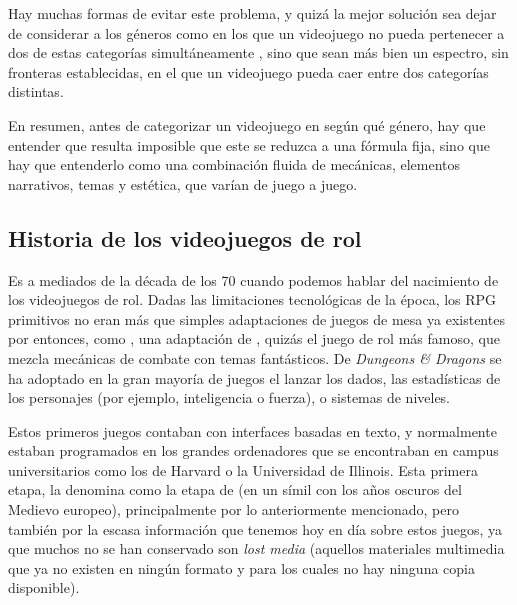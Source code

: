 \smallskip

Hay muchas formas de evitar este problema, y quizá la mejor solución sea dejar de considerar a los géneros como  en los que un videojuego no pueda pertenecer a dos de estas categorías simultáneamente \citep{Apperley}, sino que sean más bien un espectro, sin fronteras establecidas, en el que un videojuego pueda caer entre dos categorías distintas.

\smallskip

En resumen, antes de categorizar un videojuego en según qué género, hay que entender que resulta imposible que este se reduzca a una fórmula fija, sino que hay que entenderlo como una combinación fluida de mecánicas, elementos narrativos, temas y estética, que varían de juego a juego.

\subsection{Historia de los videojuegos de rol}
Es a mediados de la década de los 70 cuando podemos hablar del nacimiento de los videojuegos de rol. Dadas las limitaciones tecnológicas de la época, los RPG primitivos no eran más que simples adaptaciones de juegos de mesa ya existentes por entonces, como , una adaptación de , quizás el juego de rol más famoso, que mezcla mecánicas de combate con temas fantásticos. De \textit{Dungeons \& Dragons} se ha adoptado en la gran mayoría de juegos el lanzar los dados, las estadísticas de los personajes (por ejemplo, inteligencia o fuerza), o sistemas de niveles. 

\smallskip

Estos primeros juegos contaban con interfaces basadas en texto, y normalmente estaban programados en los grandes ordenadores que se encontraban en campus universitarios como los de Harvard o la Universidad de Illinois. Esta primera etapa, \cite{barton2008dungeons} la denomina como la etapa de  (en un símil con los años oscuros del Medievo europeo), principalmente por lo anteriormente mencionado, pero también por la escasa información que tenemos hoy en día sobre estos juegos, ya que muchos no se han conservado son \textit{lost media} (aquellos materiales multimedia que ya no existen en ningún formato y para los cuales no hay ninguna copia disponible).

\smallskip

